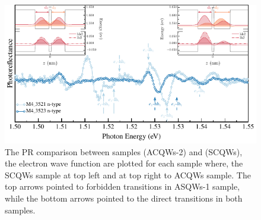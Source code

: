 \begin{figure}[ht!]
	\centering
	\includegraphics[width=\textwidth]{../figures/chapter-3/pr-plots/build-ruco/pr-set4.pdf}
	\caption{The PR comparison between samples  (ACQWs-2) and  (SCQWs), the electron wave function are plotted  for each sample where, the SCQWs sample at top left and at top right to ACQWs sample. The top arrows pointed to forbidden transitions in  ASQWs-1 sample, while the bottom arrows pointed to the direct transitions in both samples. }
	\label{fig:chapter-3-PR-PLOT-SET4}
\end{figure}

